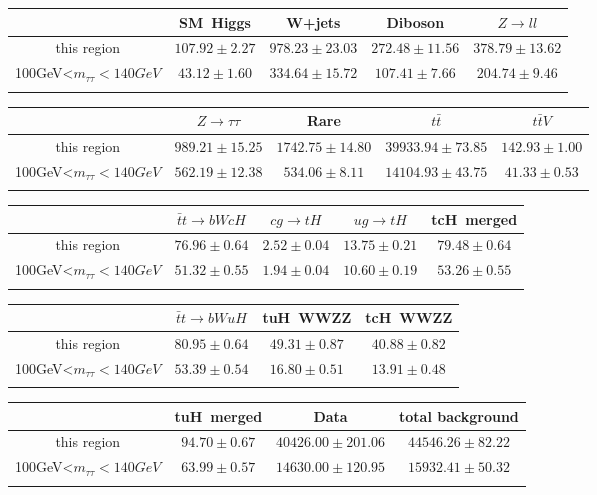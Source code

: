 \centering
\begin{tabular}{ccccc} \toprule\toprule
 & SM~Higgs & W+jets & Diboson & $Z\to ll$\\\midrule
this region & $107.92\pm2.27$ & $978.23\pm23.03$ & $272.48\pm11.56$ & $378.79\pm13.62$\\
100GeV<$m_{\tau\tau}<140GeV$ & $43.12\pm1.60$ & $334.64\pm15.72$ & $107.41\pm7.66$ & $204.74\pm9.46$\\
\bottomrule\bottomrule\\
\end{tabular}
\begin{tabular}{ccccc} \toprule\toprule
 & $Z\to \tau\tau$ & Rare & $t\bar{t}$ & $t\bar{t}V$\\\midrule
this region & $989.21\pm15.25$ & $1742.75\pm14.80$ & $39933.94\pm73.85$ & $142.93\pm1.00$\\
100GeV<$m_{\tau\tau}<140GeV$ & $562.19\pm12.38$ & $534.06\pm8.11$ & $14104.93\pm43.75$ & $41.33\pm0.53$\\
\bottomrule\bottomrule\\
\end{tabular}
\begin{tabular}{ccccc} \toprule\toprule
 & $\bar{t}t\to bWcH$ & $cg\to tH$ & $ug\to tH$ & tcH~merged\\\midrule
this region & $76.96\pm0.64$ & $2.52\pm0.04$ & $13.75\pm0.21$ & $79.48\pm0.64$\\
100GeV<$m_{\tau\tau}<140GeV$ & $51.32\pm0.55$ & $1.94\pm0.04$ & $10.60\pm0.19$ & $53.26\pm0.55$\\
\bottomrule\bottomrule\\
\end{tabular}
\begin{tabular}{cccc} \toprule\toprule
 & $\bar{t}t\to bWuH$ & tuH~WWZZ & tcH~WWZZ\\\midrule
this region & $80.95\pm0.64$ & $49.31\pm0.87$ & $40.88\pm0.82$\\
100GeV<$m_{\tau\tau}<140GeV$ & $53.39\pm0.54$ & $16.80\pm0.51$ & $13.91\pm0.48$\\
\bottomrule\bottomrule\\
\end{tabular}
\begin{tabular}{cccc} \toprule\toprule
 & tuH~merged & Data & total background\\\midrule
this region & $94.70\pm0.67$ & $40426.00\pm201.06$ & $44546.26\pm82.22$\\
100GeV<$m_{\tau\tau}<140GeV$ & $63.99\pm0.57$ & $14630.00\pm120.95$ & $15932.41\pm50.32$\\
\bottomrule\bottomrule\\
\end{tabular}
